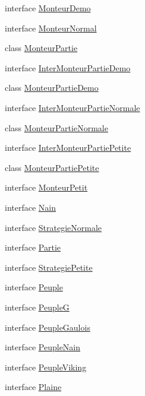 \begin{DoxyCompactItemize}
interface \hyperlink{interface_code___small_world_1_1_monteur_demo}{Monteur\-Demo}
\item 
interface \hyperlink{interface_code___small_world_1_1_monteur_normal}{Monteur\-Normal}
\item 
class \hyperlink{class_code___small_world_1_1_monteur_partie}{Monteur\-Partie}
\item 
interface \hyperlink{interface_code___small_world_1_1_inter_monteur_partie_demo}{Inter\-Monteur\-Partie\-Demo}
\item 
class \hyperlink{class_code___small_world_1_1_monteur_partie_demo}{Monteur\-Partie\-Demo}
\item 
interface \hyperlink{interface_code___small_world_1_1_inter_monteur_partie_normale}{Inter\-Monteur\-Partie\-Normale}
\item 
class \hyperlink{class_code___small_world_1_1_monteur_partie_normale}{Monteur\-Partie\-Normale}
\item 
interface \hyperlink{interface_code___small_world_1_1_inter_monteur_partie_petite}{Inter\-Monteur\-Partie\-Petite}
\item 
class \hyperlink{class_code___small_world_1_1_monteur_partie_petite}{Monteur\-Partie\-Petite}
\item 
interface \hyperlink{interface_code___small_world_1_1_monteur_petit}{Monteur\-Petit}
\item 
interface \hyperlink{interface_code___small_world_1_1_nain}{Nain}
\item 
interface \hyperlink{interface_code___small_world_1_1_strategie_normale}{Strategie\-Normale}
\item 
interface \hyperlink{interface_code___small_world_1_1_partie}{Partie}
\item 
interface \hyperlink{interface_code___small_world_1_1_strategie_petite}{Strategie\-Petite}
\item 
interface \hyperlink{interface_code___small_world_1_1_peuple}{Peuple}
\item 
interface \hyperlink{interface_code___small_world_1_1_peuple_g}{Peuple\-G}
\item 
interface \hyperlink{interface_code___small_world_1_1_peuple_gaulois}{Peuple\-Gaulois}
\item 
interface \hyperlink{interface_code___small_world_1_1_peuple_nain}{Peuple\-Nain}
\item 
interface \hyperlink{interface_code___small_world_1_1_peuple_viking}{Peuple\-Viking}
\item 
interface \hyperlink{interface_code___small_world_1_1_plaine}{Plaine}

\end{DoxyCompactItemize}
